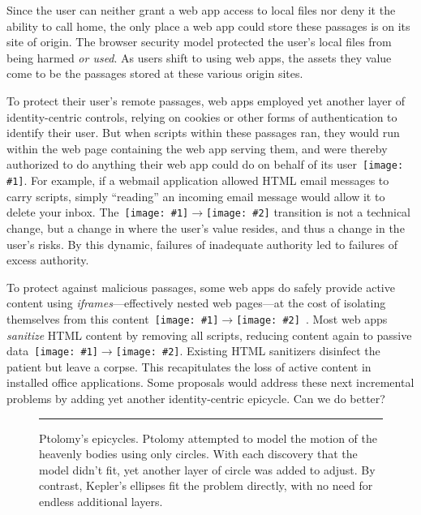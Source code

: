 \documentclass[letterpaper,twocolumn,10pt]{article}
\newcommand{\q}[1]{{\texttt{[image: \#1]}}}
\newcommand{\qq}[2]{{\texttt{[image: \#1]}}$\rightarrow${\texttt{[image: \#2]}}}
\begin{document}
Since the user can neither grant a web app access to local files nor deny it 
the ability to call home, the only place a web app could store these passages 
is on its site of origin. The browser security model protected the user's 
local files from being harmed \emph{or used}. As users shift to using web 
apps, the assets they value come to be the passages stored at these various 
origin sites. 

To protect their user's remote passages, web apps employed yet another layer 
of identity-centric controls, relying on cookies or other forms of 
authentication to identify their user. But when scripts within these passages 
ran, they would run within the web page containing the web app serving them, 
and were thereby authorized to do anything their web app could do on behalf 
of its user~\q{4}. For example, if a webmail application allowed HTML email 
messages to carry scripts, simply ``reading'' an incoming email message would 
allow it to delete your inbox. The~\qq{3}{4} transition is not a technical 
change, but a change in where the user's value resides, and thus a change in 
the user's risks. By this dynamic, failures of inadequate authority led to 
failures of excess authority.

To protect against malicious passages, some web apps do safely provide active 
content using \emph{iframes}---effectively nested web pages---at the cost of 
isolating themselves from this content~\qq{4}{3}~\cite{mashupos}. Most web 
apps \emph{sanitize} HTML content by removing all scripts, reducing content 
again to passive data~\qq{4}{1}. Existing HTML sanitizers disinfect the 
patient but leave a corpse. This recapitulates the loss of active content in 
installed office applications. Some proposals would address these next 
incremental problems by adding yet another identity-centric 
epicycle. Can we do better?

\begin{figure}[t!]

  \caption[Ptolomy's epicycles.]{Ptolomy's epicycles. Ptolomy attempted to
  model the motion of the heavenly bodies using only circles. With each
  discovery that the model didn't fit, yet another layer of circle was added
  to adjust. By contrast, Kepler's ellipses fit the problem directly, with no
  need for endless additional layers. 
  \\ } \hrule
  \label{fig:epicycle}
\end{figure}
\end{document}
